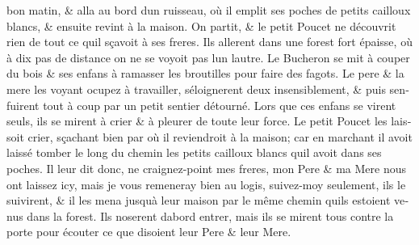 \documentclass[14pt,a4paper]{memoir}
\begin{document}
\begin{otherlanguage}{french}
bon matin, \& alla au bord d\textquotesingle un ruisseau, où il emplit
ses poches de petits cailloux blancs, \& ensuite revint à la maison. On
partit, \& le petit Poucet ne découvrit rien de tout ce
qu\textquotesingle il sçavoit à ses freres. Ils allerent dans une forest
fort épaisse, où à dix pas de distance on ne se voyoit pas
l\textquotesingle un l\textquotesingle autre. Le Bucheron se mit à
couper du bois \& ses enfans à ramasser les broutilles pour faire des
fagots. Le pere \& la mere les voyant ocupez à travailler,
s\textquotesingle éloignerent d\textquotesingle eux insensiblement, \&
puis s\textquotesingle enfuirent tout à coup par un petit sentier
détourné. Lors que ces enfans se virent seuls, ils se mirent à crier \&
à pleurer de toute leur force. Le petit Poucet les laissoit crier,
sçachant bien par où il reviendroit à la maison; car en marchant il
avoit laissé tomber le long du chemin les petits cailloux blancs
qu\textquotesingle il avoit dans ses poches. Il leur dit donc, ne
craignez-point mes freres, mon Pere \& ma Mere nous ont laissez icy,
mais je vous remeneray bien au logis, suivez-moy seulement, ils le
suivirent, \& il les mena jusqu\textquotesingle à leur maison par le
même chemin qu\textquotesingle ils estoient venus dans la forest. Ils
n\textquotesingle oserent d\textquotesingle abord entrer, mais ils se
mirent tous contre la porte pour écouter ce que disoient leur Pere \&
leur Mere.


\end{otherlanguage}
\end{document}
